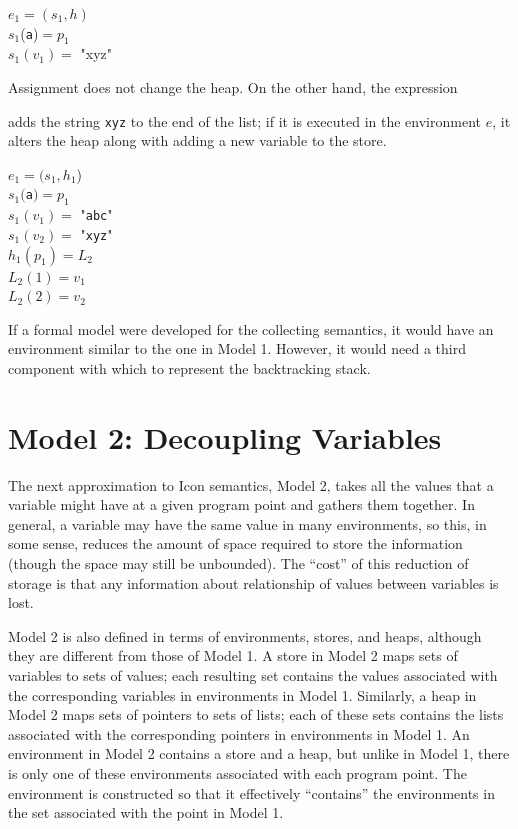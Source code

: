 \goodbreak
\begin{iconcode}
\>$e_1 = (s_1 , h)$\\
\>$s_1$(\texttt{a})$ = p_1$\\
\>$s_1(v_1) =$ "xyz"\\
\end{iconcode}

\noindent
Assignment does not change the heap. On the other hand, the expression 


\noindent adds the string \texttt{xyz} to the end of the list; if it is
executed in the environment $e$, it alters the heap along with adding a
new variable to the store.

\goodbreak
\begin{specialcode}{}
\>$e_1 = (s_1 , h_1$)\\
\>$s_1($\texttt{a}$) = p_1$\\
\>$s_1(v_1) =$ "\texttt{abc}"\\
\>$s_1(v_2) =$ "\texttt{xyz}"\\
\>$h_1(p_1) = L_2$\\
\>$L_2(1) = v_1$\\
\>$L_2(2) = v_2$\\
\end{specialcode}


If a formal model were developed for the collecting semantics, it
would have an environment similar to the one in Model 1. However, it
would need a third component with which to represent the backtracking
stack.

\section{Model 2: Decoupling Variables}

The next approximation to Icon semantics, Model 2, takes all the
values that a variable might have at a given program point and gathers
them together. In general, a variable may have the same value in many
environments, so this, in some sense, reduces the amount of space
required to store the information (though the space may still be
unbounded). The ``cost'' of this reduction of storage is that any
information about relationship of values between variables is lost.

Model 2 is also defined in terms of environments, stores, and heaps,
although they are different from those of Model 1.  A store in Model 2
maps sets of variables to sets of values; each resulting set contains
the values associated with the corresponding variables in environments
in Model 1. Similarly, a heap in Model 2 maps sets of pointers to sets
of lists; each of these sets contains the lists associated with the
corresponding pointers in environments in Model 1. An environment in
Model 2 contains a store and a heap, but unlike in Model 1, there is
only one of these environments associated with each program point. The
environment is constructed so that it effectively ``contains'' the
environments in the set associated with the point in Model 1.

